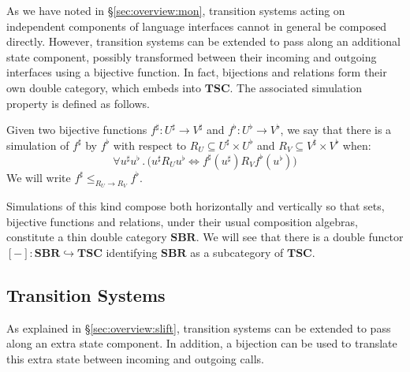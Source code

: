 \documentclass[acmsmall,screen,review,anonymous]{acmart}
\begin{document}
As we have noted in \S\ref{sec:overview:mon},
transition systems acting on independent components
of language interfaces
cannot in general be composed directly.
However,
transition systems can be extended to pass along
an additional state component,
possibly transformed between their incoming and outgoing interfaces
using a bijective function.
In fact, bijections and relations
form their own double category,
which embeds into $\mathbf{TSC}$.
The associated simulation property
is defined as follows.

\begin{definition}
Given two bijective functions
$f^\sharp : U^\sharp \rightarrow V^\sharp$ and
$f^\flat : U^\flat \rightarrow V^\flat$,
we say that there is a simulation of $f^\sharp$ by $f^\flat$
with respect to
$R_U \subseteq U^\sharp \times U^\flat$ and 
$R_V \subseteq V^\sharp \times V^\flat$
when:
\[
  \forall u^\sharp u^\flat \mathbin.
    \big( u^\sharp \mathrel{R_U} u^\flat \Leftrightarrow
     f^\sharp(u^\sharp) \mathrel{R_V} f^\flat(u^\flat) \big)
\]
We will write $f^\sharp \le_{R_U \rightarrow R_V} f^\flat$.
\end{definition}

Simulations of this kind compose
both horizontally and vertically
so that sets,
bijective functions and
relations,
under their usual composition algebras,
constitute a thin double category
$\mathbf{SBR}$.
We will see that there is a double functor
$[-] : \mathbf{SBR} \hookrightarrow \mathbf{TSC}$
identifying $\mathbf{SBR}$ as a subcategory of $\mathbf{TSC}$.


\subsection{Transition Systems} \label{sec:scomp:tr} %

As explained in \S\ref{sec:overview:slift},
transition systems can be extended
to pass along an extra state component.
In addition,
a bijection can be used to translate
this extra state between incoming and outgoing calls.
\end{document}
